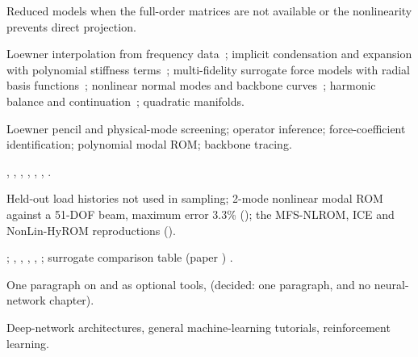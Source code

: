 \begin{description}[style=nextline,leftmargin=1em]
\item[Focus] Reduced models when the full-order matrices are not available or the nonlinearity prevents direct projection.
\item[Mathematics] Loewner interpolation from frequency data~\cite{mayo2007loewner}; implicit condensation and expansion with polynomial stiffness terms~\cite{hollkamp2008ice}; multi-fidelity surrogate force models with radial basis functions~\cite{he2023mfsnlrom}; nonlinear normal modes and backbone curves~\cite{kerschen2009nnm}; harmonic balance and continuation~\cite{keller1977}; quadratic manifolds.
\item[Algorithm] Loewner pencil and physical-mode screening; operator inference; force-coefficient identification; polynomial modal ROM; backbone tracing.
\item[Implementation] , , , , , , .
\item[Verification] Held-out load histories not used in sampling; 2-mode nonlinear modal ROM against a 51-DOF beam, maximum error 3.3\% \have{} (); the MFS-NLROM, ICE and NonLin-HyROM reproductions \have{} ().
\item[Figures and tables] ; , , , ,  \have{}; surrogate comparison table (paper ) \have{}.
\item[Note on neural models] One paragraph on  and  as optional tools, (decided: one paragraph, and no neural-network chapter).
\item[Exclusions] Deep-network architectures, general machine-learning tutorials, reinforcement learning.
\end{description}


